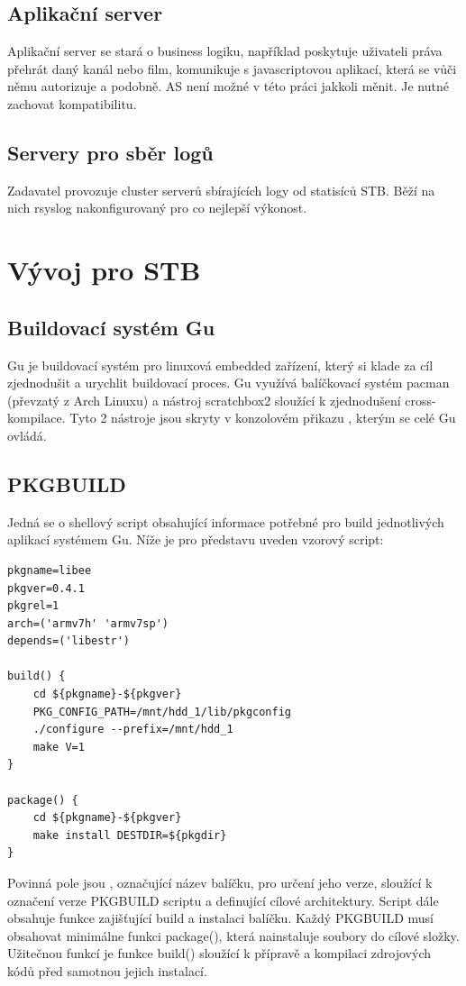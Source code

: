 \documentclass[thesis=B,czech]{FITthesis}[2012/06/26]
\begin{document}
\subsection{Aplikační server}
Aplikační server se stará o business logiku, například poskytuje uživateli práva přehrát daný kanál nebo film, komunikuje s javascriptovou aplikací, která se vůči němu autorizuje a podobně.
AS není možné v této práci jakkoli měnit. Je nutné zachovat kompatibilitu.

\subsection{Servery pro sběr logů}
Zadavatel provozuje cluster serverů sbírajících logy od statisíců STB. Běží na nich rsyslog nakonfigurovaný pro co nejlepší výkonost.


\section{Vývoj pro STB}
\subsection{Buildovací systém Gu}
Gu je buildovací systém pro linuxová embedded zařízení, který si klade za cíl zjednodušit a urychlit buildovací proces. Gu využívá balíčkovací systém pacman (převzatý z Arch Linuxu) a nástroj scratchbox2 sloužící k zjednodušení cross-kompilace. Tyto 2 nástroje jsou skryty v konzolovém přikazu , kterým se celé Gu ovládá.

\subsection{PKGBUILD}
Jedná se o shellový script obsahující informace potřebné pro build jednotlivých aplikací systémem Gu. Níže je pro představu uveden vzorový script:
\begin{scriptsize}
\begin{verbatim}
pkgname=libee
pkgver=0.4.1
pkgrel=1
arch=('armv7h' 'armv7sp')
depends=('libestr')

build() {
    cd ${pkgname}-${pkgver}
    PKG_CONFIG_PATH=/mnt/hdd_1/lib/pkgconfig
    ./configure --prefix=/mnt/hdd_1
    make V=1
}

package() {
    cd ${pkgname}-${pkgver}
    make install DESTDIR=${pkgdir}
}
\end{verbatim}
\end{scriptsize}

Povinná pole jsou , označující název balíčku,  pro určení jeho verze,  sloužící k označení verze PKGBUILD scriptu a  definující cílové architektury.
 Script dále obsahuje funkce zajišťující build a instalaci balíčku. Každý PKGBUILD musí obsahovat minimálne funkci package(), která nainstaluje soubory do cílové složky. Užitečnou funkcí je funkce build() sloužící k přípravě a kompilaci zdrojových kódů před samotnou jejich instalací.
\end{document}

